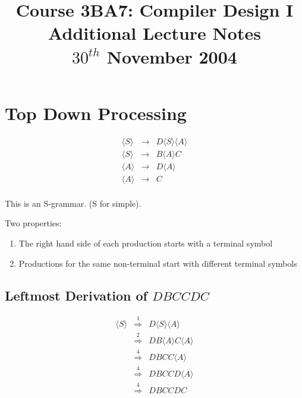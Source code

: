 \documentclass[a4paper,12pt]{article}
\newcommand{\nonterminal}[1]{\langle #1 \rangle}
\begin{document}
\title{Course 3BA7: Compiler Design I \\ Additional Lecture Notes \\ $30^{th}$ November 2004}

\maketitle

\section*{Top Down Processing}

\begin{eqnarray*}
\nonterminal{S}	&	\to	&	D \nonterminal{S} \nonterminal{A}	\\
\nonterminal{S}	&	\to	&	B \nonterminal{A}	C						\\
\nonterminal{A}	&	\to	&	D \nonterminal{A}							\\
\nonterminal{A}	&	\to	&	C 												\\
\end{eqnarray*}

This is an S-grammar. (S for simple).


Two properties:

\begin{enumerate}
\item The right hand side of each production starts with a terminal symbol

\item Productions for the same non-terminal start with different
terminal symbols
\end{enumerate}

\subsection*{Leftmost Derivation of $DBCCDC$}

\begin{eqnarray*}
\nonterminal{S}	&	\stackrel{1}{\Rightarrow}	&	D \nonterminal{S} \nonterminal{A}		\\
						&	\stackrel{2}{\Rightarrow}	&	DB \nonterminal{A} C \nonterminal{A}	\\
						&	\stackrel{4}{\Rightarrow}	&	DBCC \nonterminal{A}							\\
						&	\stackrel{4}{\Rightarrow}	&	DBCCD \nonterminal{A}						\\
						&	\stackrel{4}{\Rightarrow}	&	DBCCDC 											
\end{eqnarray*}
\end{document}

